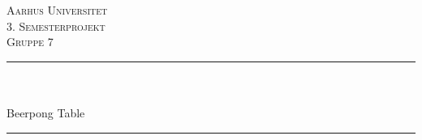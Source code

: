 \begin{titlepage}

\newcommand{\HRule}{\rule{\linewidth}{0.5mm}} %

\center %
 

\textsc{\LARGE Aarhus Universitet }\\[0.3cm] %
\textsc{\Large 3. Semesterprojekt }\\[0.3cm]
\textsc{\Large Gruppe 7 }\\[0.5cm] %


\HRule \\[0.4cm]
{ \huge \bfseries \titlename}\\[0.03cm]{Beerpong Table} %
\HRule \\[1.5cm]

 


\end{titlepage}
